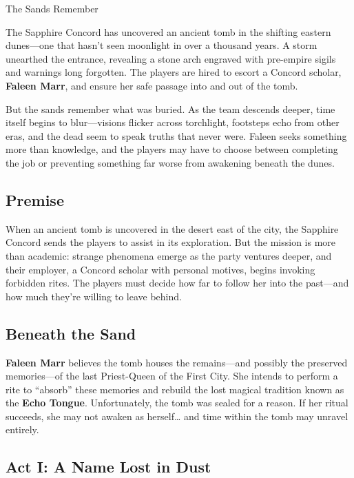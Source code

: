 

\begin{WyrdScenarioHeading}{The Sands Remember}
    \label{scenario:the-sands-remember}
    
    The Sapphire Concord has uncovered an ancient tomb in the shifting eastern dunes—one that hasn’t seen moonlight in over a thousand years. A storm unearthed the entrance, revealing a stone arch engraved with pre-empire sigils and warnings long forgotten. The players are hired to escort a Concord scholar, \textbf{Faleen Marr}, and ensure her safe passage into and out of the tomb.

    But the sands remember what was buried. As the team descends deeper, time itself begins to blur—visions flicker across torchlight, footsteps echo from other eras, and the dead seem to speak truths that never were. Faleen seeks something more than knowledge, and the players may have to choose between completing the job or preventing something far worse from awakening beneath the dunes.

    \subsection*{Premise}
    When an ancient tomb is uncovered in the desert east of the city, the Sapphire Concord sends the players to assist in its exploration. But the mission is more than academic: strange phenomena emerge as the party ventures deeper, and their employer, a Concord scholar with personal motives, begins invoking forbidden rites. The players must decide how far to follow her into the past—and how much they’re willing to leave behind.

    \subsection*{Beneath the Sand}
    \textbf{Faleen Marr} believes the tomb houses the remains—and possibly the preserved memories—of the last Priest-Queen of the First City. She intends to perform a rite to “absorb” these memories and rebuild the lost magical tradition known as the \textbf{Echo Tongue}. Unfortunately, the tomb was sealed for a reason. If her ritual succeeds, she may not awaken as herself… and time within the tomb may unravel entirely.
\end{WyrdScenarioHeading}

\subsection{Act I: A Name Lost in Dust}

